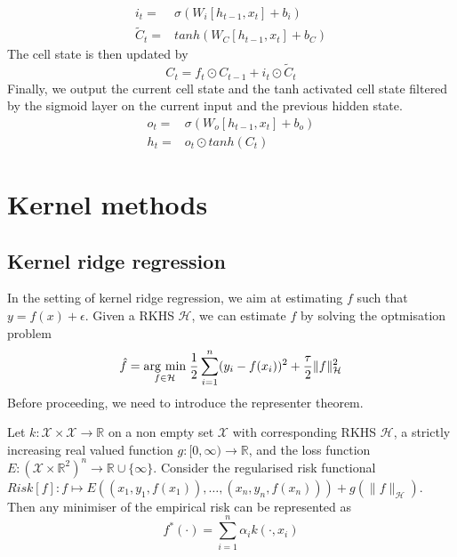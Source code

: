 \begin{equation}
    \begin{aligned}
        i_t=&\sigma(W_i [h_{t-1},x_t]+b_i)
        \\
        \tilde{C}_t=&tanh(W_C [h_{t-1},x_t]+b_C)
    \end{aligned}
\end{equation}
The cell state is then updated by
\begin{equation}
    C_t=f_t\odot C_{t-1}+i_t\odot \tilde{C}_t
\end{equation}
Finally, we output the current cell state and the tanh activated cell state filtered by the sigmoid layer on the current input and the previous hidden state.
\begin{equation}
    \begin{aligned}
    o_t=& \sigma(W_o[h_{t-1},x_t]+b_o)
    \\
    h_t=& o_t \odot tanh(C_t)
\end{aligned}
\end{equation}


\section{Kernel methods}
\subsection{Kernel ridge regression}
In the setting of kernel ridge regression, we aim at estimating $f$ such that $y=f(x)+\epsilon$. Given a RKHS $\mathcal{H}$, we can estimate $f$ by solving the optmisation problem
\begin{equation}\label{eq:kernel ridge}
    \hat{f}=\underset{f\in \mathcal{H}}{\operatorname{arg}\,\operatorname{min}}\;\frac{1}{2}\sum\limits_{i=1}^n(y_i-f(x_i))^2+\frac{\tau}{2}\|f\|_{\mathcal{H}}^2
\end{equation}
Before proceeding, we need to introduce the representer theorem.
\begin{theorem}
    Let $k:\mathcal{X} \times \mathcal{X} \to \mathbb{R}$ on a non empty set $\mathcal{X}$ with corresponding RKHS $\mathcal{H}$,
    a strictly increasing real valued function $g:[0,\infty) \to \mathbb{R}$, and the loss function $E:(\mathcal{X}\times \mathbb{R}^2)^n \to \mathbb{R} \cup \{\infty\}$.
    Consider the regularised risk functional $Risk[f]:f \mapsto  E\left((x_{1},y_{1},f(x_{1})),\ldots, (x_{n},y_{n},f(x_{n}))\right)+g\left(\| f\|_{\mathcal{H}} \right)$. Then any minimiser of the empirical risk can be represented as $$ f^{*}(\cdot )=\sum\limits_{i=1}^{n}\alpha _{i}k(\cdot ,x_{i})$$
\end{theorem}

